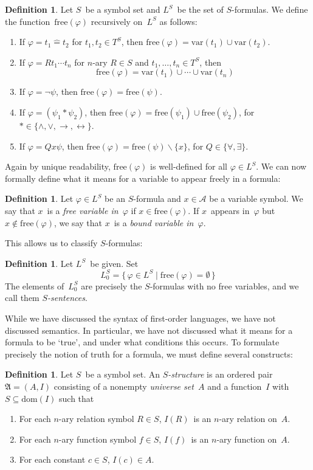 \documentclass[letterpaper]{article}
\newcommand{\A}{\mathfrak{A}}
\newcommand{\lequ}{\mathrel{\widehat{=}}}
\newcommand{\limp}{\rightarrow}
\newcommand{\liff}{\leftrightarrow}
\newcommand{\union}{\cup}
\newcommand{\dom}{\mathrm{dom}}
\newcommand{\var}{\mathrm{var}}
\newcommand{\free}{\mathrm{free}}
\numberwithin{equation}{section}
\theoremstyle{plain}
\theoremstyle{definition}
\newtheorem{defn}[equation]{Definition}
\begin{document}
\begin{defn}
Let $S$~be a symbol set and $L^S$~be the set of $S$-formulas. We define the function~$\free(\varphi)$ recursively on~$L^S$ as follows:
\begin{enumerate}[itemsep=0pt]
\item If $\varphi=t_1\lequ t_2$ for $t_1,t_2\in T^S$, then $\free(\varphi)=\var(t_1)\union\var(t_2)$.
\item If $\varphi=Rt_1\cdots t_n$ for $n$-ary $R\in S$ and $t_1,\ldots,t_n\in T^S$, then
$$\free(\varphi)=\var(t_1)\union\cdots\union\var(t_n)$$
\item If $\varphi=\lnot\psi$, then $\free(\varphi)=\free(\psi)$.
\item If $\varphi=(\psi_1*\psi_2)$, then $\free(\varphi)=\free(\psi_1)\union\free(\psi_2)$, for $*\in\{\land,\lor,\limp,\liff\}$.
\item If $\varphi=Qx\psi$, then $\free(\varphi)=\free(\psi)\backslash\{x\}$, for $Q\in\{\forall,\exists\}$.
\end{enumerate}
\end{defn}
\noindent Again by unique readability, $\free(\varphi)$ is well-defined for all $\varphi\in L^S$. We can now formally define what it means for a variable to appear freely in a formula:
\begin{defn}
Let $\varphi\in L^S$ be an $S$-formula and $x\in\mathcal{A}$ be a variable symbol. We say that $x$~is a \emph{free variable in~$\varphi$} if $x\in\free(\varphi)$. If $x$~appears in~$\varphi$ but $x\not\in\free(\varphi)$, we say that $x$~is a \emph{bound variable in~$\varphi$}.
\end{defn}
This allows us to classify $S$-formulas:
\begin{defn}
Let $L^S$~be given. Set
$$L_0^S=\{\,\varphi\in L^S\mid\free(\varphi)=\emptyset\,\}$$
The elements of~$L_0^S$ are precisely the $S$-formulas with no free variables, and we call them \emph{$S$-sentences}.
\end{defn}

While we have discussed the syntax of first-order languages, we have not discussed semantics. In particular, we have not discussed what it means for a formula to be `true', and under what conditions this occurs. To formulate precisely the notion of truth for a formula, we must define several constructs:
\begin{defn}
Let $S$~be a symbol set. An \emph{$S$-structure} is an ordered pair $\A=(A,I)$ consisting of a nonempty \emph{universe set~$A$} and a function~$I$ with $S\subseteq\dom(I)$ such that
\begin{enumerate}[itemsep=0pt]
\item For each $n$-ary relation symbol $R\in S$, $I(R)$~is an $n$-ary relation on~$A$.
\item For each $n$-ary function symbol $f\in S$, $I(f)$~is an $n$-ary function on~$A$.
\item For each constant $c\in S$, $I(c)\in A$.
\end{enumerate}
\end{defn}
\end{document}

